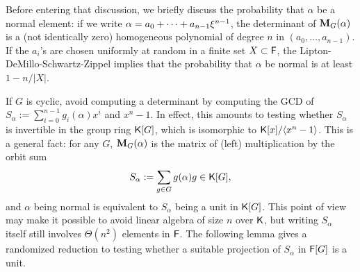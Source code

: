 Before entering that discussion, we briefly discuss the probability that
$\alpha$ be a normal element: if we write
$\alpha = a_0 + \cdots + a_{n-1} \xi^{n-1}$, the determinant of
$\mat M_G(\alpha)$ is a (not identically zero) homogeneous polynomial of
degree $n$ in $(a_0,\dots,a_{n-1})$. If the $a_i$'s are chosen uniformly at
random in a finite set $X \subset {\mathsf{F}}$, the Lipton-DeMillo-Schwartz-Zippel
implies that the probability that $\alpha$ be normal is at least $1-n/|X|$.

If $G$ is cyclic, \cite{GatGie90} avoid computing a determinant by
computing the GCD of $S_\alpha := \sum_{i = 0}^{n-1} g_i(\alpha)x^i$
and $x^n-1$. In effect, this amounts to testing whether $S_\alpha$ is
invertible in the group ring ${\mathsf{K}}[G]$, which is isomorphic to
${\mathsf{K}}[x]/\langle x^n-1\rangle$. This is a general fact: for any $G$,
$\mat M_G(\alpha)$ is the matrix of (left) multiplication by the orbit
sum
$$S_\alpha:= \sum_{g \in G} g(\alpha)g \in {\mathsf{K}}[G],$$ and $\alpha$ being
normal is equivalent to $S_\alpha$ being a unit in ${\mathsf{K}}[G]$. This point of
view may make it possible to avoid linear algebra of size $n$ over ${\mathsf{K}}$,
but writing $S_\alpha$ itself still involves $\Theta(n^2)$ elements in
${\mathsf{F}}$. The following lemma
gives a randomized reduction to testing whether a suitable projection of
$S_\alpha$ in ${\mathsf{F}}[G]$ is a unit.
 


